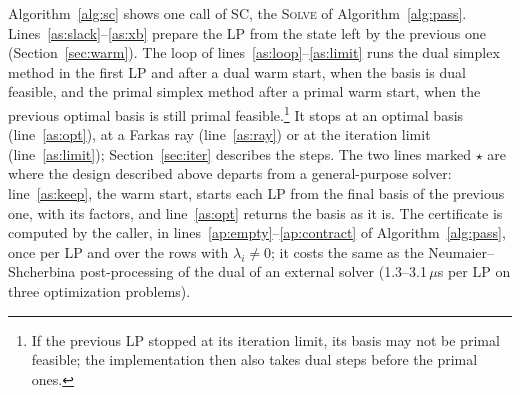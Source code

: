 \documentclass[11pt]{article}
\theoremstyle{definition}
\theoremstyle{remark}
\begin{document}
Algorithm~\ref{alg:sc} shows one call of SC, the \textsc{Solve} of
Algorithm~\ref{alg:pass}. Lines~\ref{as:slack}--\ref{as:xb} prepare the LP
from the state left by the previous one (Section~\ref{sec:warm}). The loop of
lines~\ref{as:loop}--\ref{as:limit} runs the dual simplex method in the first
LP and after a dual warm start, when the basis is dual feasible, and the
primal simplex method after a primal warm start, when the previous optimal
basis is still primal feasible.\footnote{If the previous LP stopped at its
iteration limit, its basis may not be primal feasible; the implementation then
also takes dual steps before the primal ones.} It stops at an optimal basis
(line~\ref{as:opt}), at a Farkas ray (line~\ref{as:ray}) or at the iteration
limit (line~\ref{as:limit}); Section~\ref{sec:iter} describes the steps. The two lines marked $\star$ are
where the design described above departs from a general-purpose solver:
line~\ref{as:keep}, the warm start, starts each LP from the final basis of
the previous one, with its factors,
and line~\ref{as:opt} returns the basis as it is. The certificate is computed
by the caller, in lines~\ref{ap:empty}--\ref{ap:contract} of
Algorithm~\ref{alg:pass}, once per LP and over the rows with $\lambda_i\neq0$;
it costs the same as the Neumaier--Shcherbina post-processing of the dual of an
external solver (1.3--3.1\,$\mu$s per LP on three optimization problems).
\end{document}

